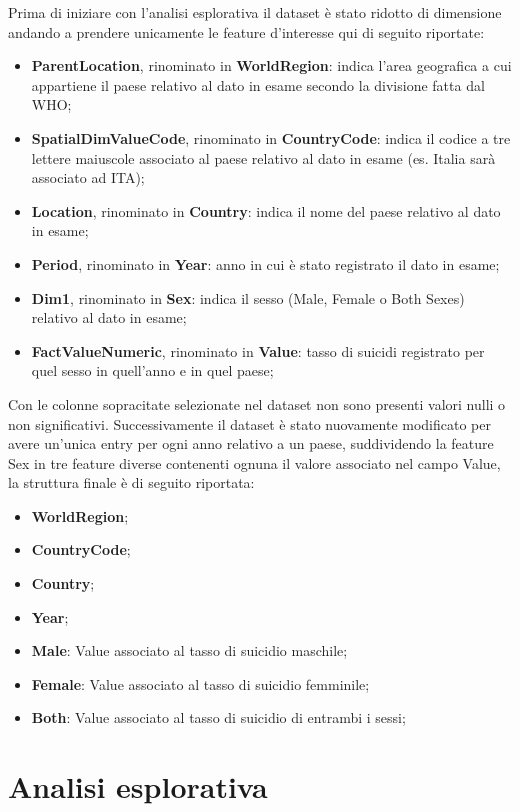 \documentclass[conference]{IEEEtran}
\begin{document}
Prima di iniziare con l'analisi esplorativa il dataset è stato ridotto di
dimensione andando a prendere unicamente le feature d'interesse qui di seguito
riportate:
\begin{itemize}
    \item \textbf{ParentLocation}, rinominato in \textbf{WorldRegion}: 
    indica l'area geografica a cui appartiene il paese relativo al dato
    in esame secondo la divisione fatta dal WHO;
    \item \textbf{SpatialDimValueCode}, rinominato in \textbf{CountryCode}: 
    indica il codice a tre lettere maiuscole associato al paese relativo
    al dato in esame (es. Italia sarà associato ad ITA);
    \item \textbf{Location}, rinominato in \textbf{Country}: 
    indica il nome del paese  relativo al dato in esame;
    \item \textbf{Period}, rinominato in \textbf{Year}: 
    anno in cui è stato registrato il dato in esame;
    \item \textbf{Dim1}, rinominato in \textbf{Sex}: 
    indica il sesso (Male, Female o Both Sexes)
    relativo al dato in esame;
    \item \textbf{FactValueNumeric}, rinominato in \textbf{Value}: 
    tasso di suicidi registrato per quel sesso in quell'anno e in quel paese;
\end{itemize}
Con le colonne sopracitate selezionate nel dataset non sono presenti
valori nulli o non significativi.
Successivamente il dataset è stato nuovamente modificato per
avere un'unica entry per ogni anno relativo a un paese, suddividendo la feature Sex
in tre feature diverse contenenti ognuna il valore associato nel campo Value,
la struttura finale è di seguito riportata:
\begin{itemize}
    \item \textbf{WorldRegion};
    \item \textbf{CountryCode};
    \item \textbf{Country};
    \item \textbf{Year};
    \item \textbf{Male}: Value associato al tasso di suicidio maschile;
    \item \textbf{Female}: Value associato al tasso di suicidio femminile;
    \item \textbf{Both}: Value associato al tasso di suicidio di entrambi i sessi;
\end{itemize}

\section{Analisi esplorativa}
\end{document}
